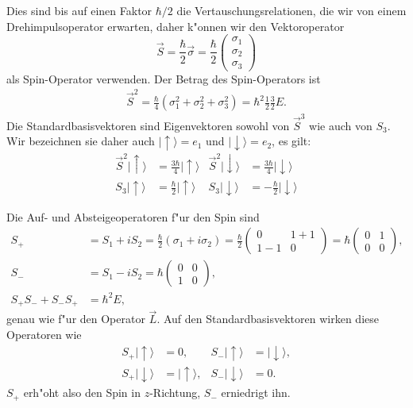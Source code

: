 Dies sind bis auf einen Faktor $\hbar/2$ die Vertauschungsrelationen,
die wir von einem Drehimpulsoperator erwarten,
daher k"onnen wir den Vektoroperator
\begin{equation}
\vec S=\frac{\hbar}2\vec\sigma
=
\frac{\hbar}2\begin{pmatrix}\sigma_1\\\sigma_2\\\sigma_3\end{pmatrix}
\label{spin:vektoroperator}
\end{equation}
als Spin-Operator verwenden.
Der Betrag des Spin-Operators ist
\begin{align*}
\vec S^2
=
\frac{\hbar}{4}(\sigma_1^2+\sigma_2^2+\sigma_3^2)=\hbar^2\frac12\frac32E.
\end{align*}
Die Standardbasisvektoren sind Eigenvektoren sowohl von $\vec S^3$ wie
auch von $S_3$.
Wir bezeichnen sie daher auch $|\uparrow\rangle=e_1$ und
$|\downarrow\rangle=e_2$, es gilt:
\begin{align*}
\vec S^2|\uparrow\rangle&=\frac{3\hbar}4|\uparrow\rangle
&
\vec S^2|\downarrow\rangle&=\frac{3\hbar}4|\downarrow\rangle
\\
S_3|\uparrow\rangle&=\frac{\hbar}{2}|\uparrow\rangle
&
S_3|\downarrow\rangle&=-\frac{\hbar}{2}|\downarrow\rangle
\end{align*}

Die Auf- und Absteigeoperatoren f"ur den Spin sind
\begin{align}
S_+
&=
S_1+iS_2
=
\frac{\hbar}2
(\sigma_1+i\sigma_2)
=
\frac{\hbar}2
\begin{pmatrix} 0&1+1\\1-1&0 \end{pmatrix}
=\hbar\begin{pmatrix}0&1\\0&0\end{pmatrix},
\\
S_-
&=
S_1-iS_2
=
\hbar\begin{pmatrix} 0&0\\1&0\end{pmatrix},
\\
S_+S_-+S_-S_+
&=
\hbar^2E,
\end{align}
genau wie f"ur den Operator $\vec L$.
Auf den Standardbasisvektoren wirken diese Operatoren wie
\begin{align*}
S_+|\uparrow\rangle&=0,
&
S_-|\uparrow\rangle&=|\downarrow\rangle,
\\
S_+|\downarrow\rangle&=|\uparrow\rangle,
&
S_-|\downarrow\rangle&=0.
\end{align*}
$S_+$ erh"oht also den Spin in $z$-Richtung, $S_-$ erniedrigt ihn.

